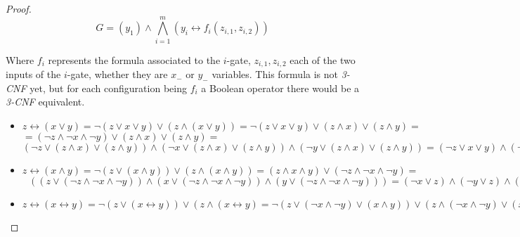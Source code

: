 \begin{definition}
\begin{proof}
      $$ G = (y_1) \wedge \bigwedge_{i=1}^m (y_i \leftrightarrow f_i(z_{i,1},z_{i,2}))$$

      Where $f_i$ represents the formula associated to the $i$-gate, $z_{i,1},z_{i,2}$ each of the two inputs of the $i$-gate, whether they are $x_-$ or $y_-$ variables. This formula is not \emph{3-CNF} yet, but for each configuration being $f_i$ a Boolean operator there would be a \emph{3-CNF} equivalent.

      \begin{itemize}
      \item $z \leftrightarrow( x \vee y )  = \neg  ( z \vee  x \vee y    ) \vee (z \wedge ( x \vee y )  ) = \neg  ( z \vee  x \vee y    ) \vee (z \wedge x)  \vee (z \wedge y ) =$\\$= ( \neg  z \wedge  \neg  x \wedge \neg   y    ) \vee (z \wedge x)  \vee (z \wedge y )  =$$
        (\neg  z \vee (z \wedge x)  \vee (z \wedge y ))  \wedge  
        (\neg  x \vee (z \wedge x)  \vee (z \wedge y )) \wedge
        (\neg  y \vee (z \wedge x)  \vee (z \wedge y ))   =
        (\neg  z \vee x  \vee y )  \wedge  
        (\neg  x \vee z  ) \wedge
        (\neg  y \vee z ) $   
      \item $z \leftrightarrow( x \wedge y ) = \neg ( z \vee ( x \wedge y )) \vee (z \wedge ( x \wedge y )) = (z\wedge x \wedge y ) \vee  (\neg  z\wedge \neg  x \wedge \neg  y )  =$\\$\ \ \ ((z\vee  (\neg  z\wedge \neg  x \wedge \neg  y )  ) \wedge (x \vee  (\neg  z\wedge \neg  x \wedge \neg  y )  ) \wedge (y\vee  (\neg  z\wedge \neg  x \wedge \neg  y )  ) ) = (\neg  x \vee z) \wedge (\neg  y \vee z ) \wedge (\neg  z \vee x ) \wedge (\neg  y \vee x ) \wedge(\neg  z\vee y )\wedge (\neg  x\vee y )$
	
      \item $z \leftrightarrow( x \leftrightarrow y ) =  \neg ( z \vee ( x \leftrightarrow y ) ) \vee (z \wedge ( x \leftrightarrow y ) = \neg ( z \vee (\neg  x \wedge \neg  y) \vee (x \wedge y)) \vee (z \wedge(\neg  x \wedge \neg  y) \vee (x \wedge y))  )=(\neg  z \wedge \neg  (\neg  x \wedge \neg  y) \wedge \neg  (x \wedge y)) \vee (z \wedge(\neg  x \wedge \neg  y) \vee (x \wedge y))  )=(\neg  z \wedge  (x \vee  y) \wedge (\neg  x \vee \neg  y)) \vee (z \wedge(\neg  x \wedge \neg  y) \vee (x \wedge y))  )=z \vee ( \neg  x \wedge \neg  y) = (\neg x \vee \neg y \vee z) \wedge (\neg x \vee \neg z \vee y) \wedge (y \vee z \vee x) \wedge (y \vee \neg y \vee x) \wedge (\neg z \vee z \vee x) \wedge (\neg z \vee \neg y \vee x)$
	

\end{itemize}
\end{proof}
\end{definition}
